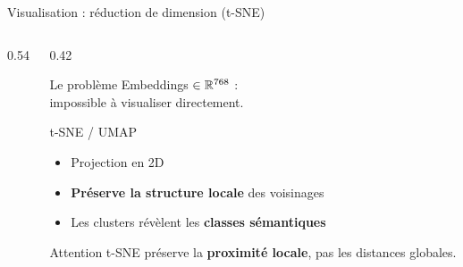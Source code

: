 \documentclass[aspectratio=169, 10pt]{beamer}
\begin{document}
\begin{frame}{Visualisation : réduction de dimension (t-SNE)}
\begin{columns}[T]
\begin{column}{0.54\textwidth}
    \end{column}
    \begin{column}{0.42\textwidth}
      \begin{block}{Le problème}
        Embeddings $\in \mathbb{R}^{768}$ :\\
        impossible à visualiser directement.
      \end{block}
      \smallskip
      \begin{exampleblock}{t-SNE / UMAP}
        \begin{itemize}
          \item Projection en 2D
          \item \textbf{Préserve la structure locale}
                des voisinages
          \item Les clusters révèlent les
                \textbf{classes sémantiques}
        \end{itemize}
      \end{exampleblock}
      \vspace{2pt}
      \begin{alertblock}{Attention}
        t-SNE préserve la \textbf{proximité locale},
        pas les distances globales.
      \end{alertblock}
    \end{column}
  \end{columns}
\end{frame}
\end{document}
